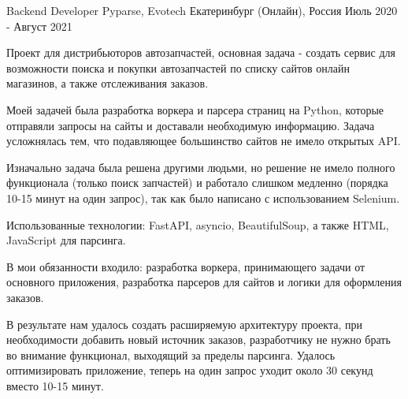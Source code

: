 

\begin{cventries}

  \cventry
    {Backend Developer} %
    {Pyparse, Evotech} %
    {Екатеринбург (Онлайн), Россия} %
    {Июль 2020 - Август 2021} %
    {
      \begin{cvitems} %
        \item {Проект для дистрибьюторов автозапчастей, основная задача - создать сервис для возможности поиска и покупки автозапчастей по списку сайтов онлайн магазинов, а также отслеживания заказов. }
        \item {Моей задачей была разработка воркера и парсера страниц на Python, которые отправяли запросы на сайты и доставали необходимую информацию. Задача усложнялась тем, что подавляющее большинство сайтов не имело открытых API. }
        \item {Изначально задача была решена другими людьми, но решение не имело полного функционала (только поиск запчастей) и работало слишком медленно (порядка 10-15 минут на один запрос), так как было написано с использованием Selenium. }
        \item {Использованные технологии: FastAPI, asyncio, BeautifulSoup, а также HTML, JavaScript для парсинга. }
        \item {В мои обязанности входило: разработка воркера, принимающего задачи от основного приложения, разработка парсеров для сайтов и логики для оформления заказов. }
        \item {В результате нам удалось создать расширяемую архитектуру проекта, при необходимости добавить новый источник заказов, разработчику не нужно брать во внимание функционал, выходящий за пределы парсинга. Удалось оптимизировать приложение, теперь на один запрос уходит около 30 секунд вместо 10-15 минут. }
      \end{cvitems}
    }


\end{cventries}
